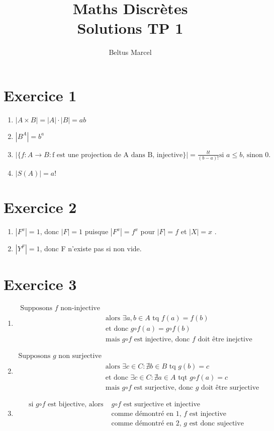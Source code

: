 \documentclass[fontsize=10pt]{article}
\title{\textbf{Maths Discrètes}\\ Solutions TP 1}
\author{Beltus Marcel}
\date{}
\begin{document}
\maketitle %


\section*{Exercice 1}
\begin{enumerate}
\item $|A\times B | = |A|\cdot|B|=ab$
\item $|B^A|=b^a$
\item $|\{f:A \rightarrow B : \text{f est une projection de A dans B, injective}\}| = \frac{b!}{(b-a)!}\text{si $a \leq b$, sinon 0.}$
\item $|S(A)| = a!$
\end{enumerate}
\section*{Exercice 2}
\begin{enumerate}
\item $|F^x| = 1$, donc $|F|=1$ puisque $|F^x|=f^x$ pour $|F|=f$ et $|X|=x$ .
\item $|Y^F|=1$, donc F n'existe pas si non vide.
\end{enumerate}

\section*{Exercice 3}
\begin{enumerate}
\item \begin{align*}
\text{Supposons $f$ non-injective}&\\
&\text{alors } \exists a,b \in A \text{ tq } f(a)=f(b)\\
&\text{et donc } g\mathord\circ f (a) = g\mathord\circ f (b)\\
&\text{mais }g\mathord\circ f \text{ est injective, donc $f$ doit être inejctive}
\end{align*}
\item \begin{align*}
\text{Supposons $g$ non surjective}& \\
&\text{alors } \exists c \in C : \nexists b \in B \text{ tq } g(b) = c\\
&\text{et donc }\exists c \in C : \nexists a \in A \text{ tqt } g\mathord\circ f(a ) = c\\
&\text{mais $g\mathord\circ f$ est surjective, donc $g$ doit être surjective}
\end{align*}
\item \begin{align*}
\text{si $g\mathord\circ f$ est bijective, alors }&\text{$g\mathord\circ f$ est surjective et injective}\\
& \text{comme démontré en 1, $f$ est injective}\\
& \text{comme démontré en 2, $g$ est donc sujective}
\end{align*}
\end{enumerate}
\end{document}
